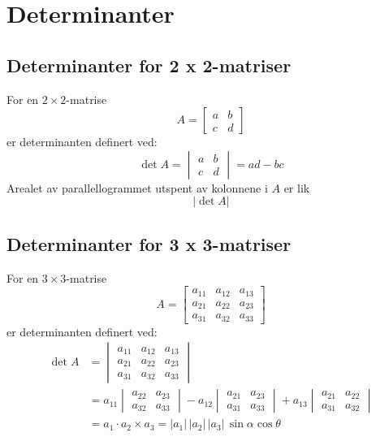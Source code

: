 \documentclass{article}
\begin{document}
\clearpage
\section{Determinanter}

\subsection{Determinanter for 2 x 2-matriser}
For en $2 \times 2$-matrise
\[ A = \begin{bmatrix} a & b \\ c & d \end{bmatrix} \]
er determinanten definert ved:
\[ \det{A} = \begin{vmatrix} a & b \\ c & d \end{vmatrix} = ad - bc \]
Arealet av parallellogrammet utspent av kolonnene i $A$ er lik
\[ | \det{A} | \]


\subsection{Determinanter for 3 x 3-matriser}
For en $3 \times 3$-matrise
\[ A =
\begin{bmatrix}
a_{11} & a_{12} & a_{13} \\
a_{21} & a_{22} & a_{23} \\
a_{31} & a_{32} & a_{33}
\end{bmatrix} \]
er determinanten definert ved:
\begin{align*}
    \det{A} &=
    \begin{vmatrix}
    a_{11} & a_{12} & a_{13} \\
    a_{21} & a_{22} & a_{23} \\
    a_{31} & a_{32} & a_{33}
    \end{vmatrix} \\
    &= a_{11}\begin{vmatrix} a_{22} & a_{23} \\ a_{32} & a_{33} \end{vmatrix}
    - a_{12}\begin{vmatrix} a_{21} & a_{23} \\ a_{31} & a_{33} \end{vmatrix}
    + a_{13}\begin{vmatrix} a_{21} & a_{22} \\ a_{31} & a_{32} \end{vmatrix}\\
    &= a_1 \cdot a_2 \times a_3 = |a_1|\,|a_2|\,|a_3|\,\sin{\alpha}\cos{\theta}
\end{align*}
\end{document}
